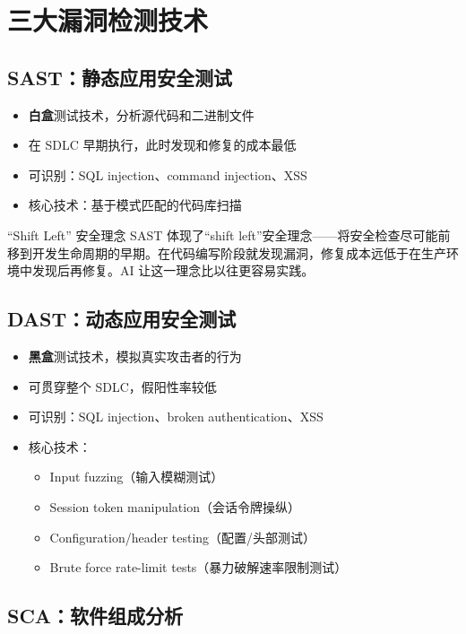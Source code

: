 \section{三大漏洞检测技术}

\subsection{SAST：静态应用安全测试}

\begin{itemize}
    \item \textbf{白盒}测试技术，分析源代码和二进制文件
    \item 在 SDLC 早期执行，此时发现和修复的成本最低
    \item 可识别：SQL injection、command injection、XSS
    \item 核心技术：基于模式匹配的代码库扫描
\end{itemize}

\begin{knowledgebox}{``Shift Left'' 安全理念}
SAST 体现了``shift left''安全理念——将安全检查尽可能前移到开发生命周期的早期。在代码编写阶段就发现漏洞，修复成本远低于在生产环境中发现后再修复。AI 让这一理念比以往更容易实践。
\end{knowledgebox}

\subsection{DAST：动态应用安全测试}

\begin{itemize}
    \item \textbf{黑盒}测试技术，模拟真实攻击者的行为
    \item 可贯穿整个 SDLC，假阳性率较低
    \item 可识别：SQL injection、broken authentication、XSS
    \item 核心技术：
    \begin{itemize}
        \item Input fuzzing（输入模糊测试）
        \item Session token manipulation（会话令牌操纵）
        \item Configuration/header testing（配置/头部测试）
        \item Brute force rate-limit tests（暴力破解速率限制测试）
    \end{itemize}
\end{itemize}

\subsection{SCA：软件组成分析}

